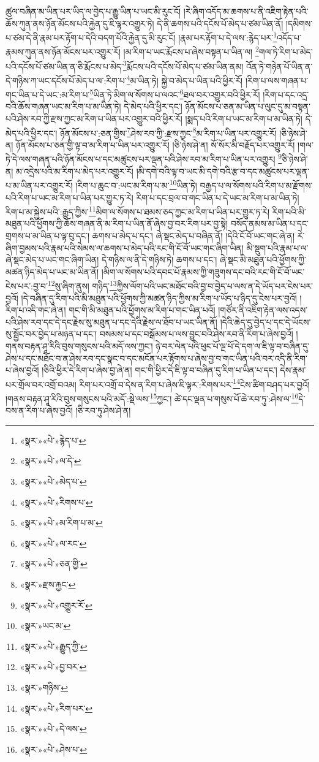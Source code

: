 ཚུལ་བཞིན་མ་ཡིན་པར་ཡིད་ལ་བྱེད་པ་རྒྱུ་ཡིན་པ་ཡང་མི་རུང་ངོ། །རེ་ཞིག་འདོད་མ་ཆགས་པ་ནི་འཇིག་རྟེན་པའི་ཆོས་ཀུན་ནས་ཉོན་མོངས་པའི་རྐྱེན་དུ་ཇི་ལྟར་འགྱུར་ཏེ། དེ་ནི་ཆགས་པའི་དངོས་པོ་མེད་པ་ཙམ་ཡིན་ནོ། །དམིགས་པ་ཙམ་དེ་ནི་རྣམ་པར་རྟོག་པ་དེའི་བདག་པོའི་རྐྱེན་དུ་མི་རུང་ངོ། །རྣམ་པར་རྟོག་པ་དེ་ལས་:རྙེད་པར་\footnote{«སྣར་»«པེ་»རྙེད་པ་}འདོད་པ་རྣམས་ཀུན་ནས་ཉོན་མོངས་པར་འགྱུར་རོ། །མ་རིག་པ་ཡང་རྨོངས་པ་ཞེས་བསྟན་པ་ཡིན་ལ། \footnote{«སྣར་»«པེ་»ལ་དེ་}གལ་ཏེ་རིག་པ་མེད་པའི་དངོས་པོ་ཙམ་ཡིན་ན་ཅི་རྨོངས་པ་མེད་\footnote{«སྣར་»«པེ་»མེད་པ་}རྨོངས་པའི་དངོས་པོ་མེད་པ་ཙམ་ཡིན་ནམ། འོན་ཏེ་གཉེན་པོ་ཡིན་ན་དེ་གཉིས་ཀ་ཡང་དངོས་པོ་མེད་པ་ལ་:རིག་པ་\footnote{«སྣར་»«པེ་»རིགས་པ་}མ་ཡིན་ཏེ། སྐྱེ་བ་མེད་པ་ཡིན་པའི་ཕྱིར་རོ། །རིག་པ་ལས་གཞན་པ་གང་ཡིན་པ་དེ་ཡང་:མ་རིག་པ་\footnote{«སྣར་»«པེ་»མ་རིག་པ་མ་}ཡིན་ཏེ་མིག་ལ་སོགས་པ་ལའང་\footnote{«སྣར་»«པེ་»ལ་རང་}ཐལ་བར་འགྱུར་བའི་ཕྱིར་རོ། །རིག་པ་དང་འདྲ་བའི་ཆོས་གཞན་ཡང་མ་རིག་པ་མ་ཡིན་ཏེ། དེ་མེད་པའི་ཕྱིར་དང་། ཉོན་མོངས་པ་ཅན་མ་ཡིན་པ་ལུང་དུ་མ་བསྟན་པའི་ཤེས་རབ་ཀྱི་རྫས་ཀྱང་མ་རིག་པ་ཡིན་པར་འགྱུར་བའི་ཕྱིར་རོ། །སྨད་པའི་རིག་པ་ཡང་མ་རིག་པ་མ་ཡིན་ཏེ། དེ་མེད་པའི་ཕྱིར་དང་། ཉོན་མོངས་པ་:ཅན་གྱིས་\footnote{«སྣར་»«པེ་»ཅན་གྱི་}ཤེས་རབ་ཀྱི་:རྫས་ཀྱང་\footnote{«སྣར་»རྫས་རྐྱང་}མ་རིག་པ་ཡིན་པར་འགྱུར་རོ། །ཅི་ཉེས་ཤེ་ན། ཉོན་མོངས་པ་ཅན་གྱི་ལྟ་བ་མ་རིག་པ་ཡིན་པར་འགྱུར་རོ། །ཅི་ཉེས་ཤེ་ན། སོ་སོར་མི་བརྗོད་པར་འགྱུར་རོ། །གལ་ཏེ་དེ་ལས་གཞན་པའི་ཉོན་མོངས་པ་དང་མཚུངས་པར་ལྡན་པའི་ཤེས་རབ་མ་རིག་པ་ཡིན་པར་འགྱུར། \footnote{«སྣར་»«པེ་»འགྱུར་རོ་}ཅི་ཉེས་ཤེ་ན། མ་འདྲེས་པའི་མ་རིག་པ་མེད་པར་འགྱུར་རོ། །མི་དགེ་བའི་ལྟ་བ་ཡང་མི་དགེ་བའི་རྩ་བ་དང་མཚུངས་པར་ལྡན་པ་མ་ཡིན་པར་འགྱུར་རོ། །རིག་པ་ཆུང་བ་:ཡང་མ་རིག་པ་མ་\footnote{«སྣར་»ཡང་མ་}ཡིན་ཏེ། བརྒྱད་པ་ལ་སོགས་པའི་རིག་པ་མ་རྫོགས་པའི་རིག་པ་ཡང་མ་རིག་པ་ཡིན་པར་གྱུར་ཏ་རེ། རིག་པ་དང་བྲལ་བ་གང་ཡིན་པ་དེ་ཡང་མ་རིག་པ་མ་ཡིན་ཏེ། རིག་པ་མ་སྐྱེས་པའི་:རྒྱུད་ཀྱིས་\footnote{«སྣར་»«པེ་»རྒྱུད་ཀྱི་}མིག་ལ་སོགས་པ་ཐམས་ཅད་ཀྱང་མ་རིག་པ་ཡིན་པར་གྱུར་ཏ་རེ། རིག་པའི་མི་མཐུན་པའི་ཕྱོགས་ཀྱི་ཆོས་གཞན་ནི་མ་རིག་པ་ཡིན་ནོ་ཞེས་བྱ་བར་རིག་པར་བྱ་སྟེ། བསོད་ནམས་མ་ཡིན་པ་དང་གྲགས་པ་མ་ཡིན་པ་ལྟ་བུ་དང་། ཆགས་པ་མེད་པ་དང་། ཞེ་སྡང་མེད་པ་བཞིན་ནོ། །དེའི་ངོ་བོ་ཡང་གང་ཞེ་ན། རེ་ཞིག་བྱམས་པའི་རྣམ་པའི་སེམས་ལ་ཆགས་པ་མེད་པའི་རང་གི་ངོ་བོ་ཡང་གང་ཞིག་ཡིན། མི་སྡུག་པའི་རྣམ་པ་ལ་ཞེ་སྡང་མེད་པ་ཡང་གང་ཞིག་ཡིན། དེ་གཉིས་ལ་ནི་དེ་གཉིས་ཏེ། ཆགས་པ་དང་། ཞེ་སྡང་མི་མཐུན་པའི་ཕྱོགས་ཀྱི་མཚན་ཉིད་མེད་པ་ཡང་མ་ཡིན་ནོ། །མིག་ལ་སོགས་པའི་དབང་པོ་རྣམས་ཀྱི་གཟུགས་དང་བའི་རང་གི་ངོ་བོ་ཡང་ངེས་པར་:བྱ་བ་\footnote{«སྣར་»«པེ་»བྱ་བར་}སུ་ཞིག་ནུས། གཉིད་\footnote{«སྣར་»གཉིས་}ཀྱིས་ལོག་པའི་ཡང་མཐོང་བའི་བྱ་བ་བྱེད་པ་ལས་ན་དེ་ཡོད་པར་ངེས་པར་བྱའོ། །དེ་བཞིན་དུ་རིག་པའི་མི་མཐུན་པའི་ཕྱོགས་ཀྱི་མཚན་ཉིད་ཀྱིས་མ་རིག་པ་ཡོད་པ་ཉིད་དུ་ངེས་པར་བྱའོ། །རིག་པ་འདི་གང་ཞེ་ན། གང་གི་མི་མཐུན་པའི་ཕྱོགས་མ་རིག་པ་གང་ཡིན་པའོ། །གཙོར་ནི་འཇིག་རྟེན་ལས་འདས་པའི་ཤེས་རབ་དང་དེ་དང་རྗེས་སུ་མཐུན་པ་དང་དེའི་རྗེས་ལ་ཐོབ་པ་ཡང་ཡིན་ནོ། །དེའི་ཆེད་དུ་བྱེད་པ་དང་དེ་ཡོངས་སུ་སྦྱོང་བར་བྱེད་པ་མཉན་པ་དང་། བསམས་པ་དང་བསྒོམས་པ་ལས་བྱུང་བའི་ཤེས་རབ་ནི་རིག་པ་ཞེས་བྱའོ། །གནས་བརྟན་ཤཱ་རིའི་བུས་གསུངས་པའི་མདོ་ལས་ཀྱང་། ཉེ་བར་ལེན་པའི་ཕུང་པོ་ལྔ་པོ་དེ་དག་ལ་ཇི་ལྟ་བ་བཞིན་དུ་ཤེས་པ་དང་མཐོང་བ་ན་ཤེས་རབ་དང་སྣང་བ་དང་མངོན་པར་རྟོགས་པ་ཞེས་བྱ་བ་གང་ཡིན་པའི་བར་འདི་ནི་རིག་པ་ཞེས་བྱའོ། །ཅིའི་ཕྱིར་དེ་རིག་པ་ཞེས་བྱ་ཞེ་ན། གང་གི་ཕྱིར་དེ་ཇི་ལྟ་བ་བཞིན་དུ་རིག་པ་ཡིན་པ་དང་། དེས་རྣམ་པར་གྲོལ་བར་འགྲོ་བའམ། རིག་པར་འགྲོ་བ་དེས་ན་རིག་པ་ཞེས་ཇི་ལྟར་:རིགས་པར་\footnote{«སྣར་»«པེ་»རིག་པར་}ངེས་ཚིག་བཤད་པར་བྱའོ། །གནས་བརྟན་ཤཱ་རིའི་བུས་གསུངས་པའི་མདོ་:སྡེ་ལས་\footnote{«སྣར་»«པེ་»དེ་ལས་}ཀྱང་། ཚེ་དང་ལྡན་པ་གསུས་པོ་ཆེ་རབ་ཏུ་:ཤེས་ལ་\footnote{«སྣར་»«པེ་»ཤེས་པ་}དེ་བས་ན་རིག་པ་ཞེས་བྱའོ། །ཅི་རབ་ཏུ་ཤེས་ཤེ་ན། 